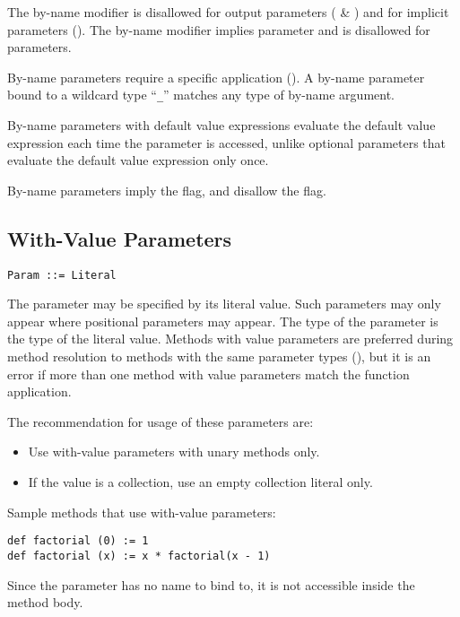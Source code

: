 The by-name modifier is disallowed for output parameters ( \& ) and for implicit parameters (). The by-name modifier implies  parameter and is disallowed for  parameters. 

By-name parameters require a specific application (). A by-name parameter bound to a wildcard type ``\lstinline!_!'' matches any type of by-name argument. 

By-name parameters with default value expressions evaluate the default value expression each time the parameter is accessed, unlike optional parameters that evaluate the default value expression only once. 

By-name parameters imply the  flag, and disallow the  flag. 

\subsection{With-Value Parameters}
\label{sec:with-value-parameters}

\syntax\begin{lstlisting}
Param ::= Literal
\end{lstlisting}

The parameter may be specified by its literal value. Such parameters may only appear where positional parameters may appear. The type of the parameter is the type of the literal value. Methods with value parameters are preferred during method resolution to methods with the same parameter types (), but it is an error if more than one method with value parameters match the function application. 

The recommendation for usage of these parameters are: 
\begin{itemize}
\item Use with-value parameters with unary methods only. 
\item If the value is a collection, use an empty collection literal only. 
\end{itemize}

\example Sample methods that use with-value parameters:
\begin{lstlisting}
def factorial (0) := 1
def factorial (x) := x * factorial(x - 1)
\end{lstlisting}

Since the parameter has no name to bind to, it is not accessible inside the method body. 


